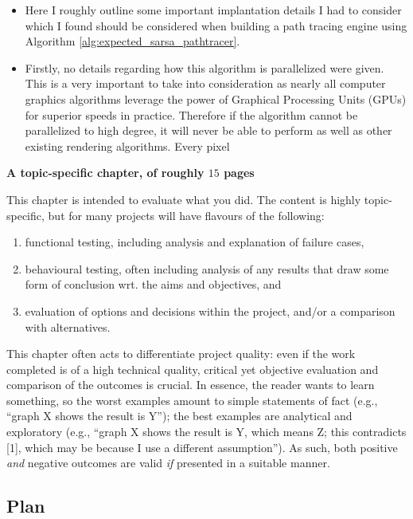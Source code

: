 \documentclass[ %
                    author={Callum Pearce},
                supervisor={Dr. Neill Campbell},
                    degree={MEng},
                     title={How effective are Temporal difference learning methods for reducing the number of zero contribution light paths, while still accurately approximating Global Illumination in Path tracing?},
                  subtitle={},
                      type={research},
                      year={2019} ]{dissertation}
\begin{document}
\begin{itemize}
\item Here I roughly outline some important implantation details I had to consider which I found should be considered when building a path tracing engine using Algorithm \ref{alg:expected_sarsa_pathtracer}.

\item Firstly, no details regarding how this algorithm is parallelized were given. This is a very important to take into consideration as nearly all computer graphics algorithms leverage the power of Graphical Processing Units (GPUs) for superior speeds in practice. Therefore if the algorithm cannot be parallelized to high degree, it will never be able to perform as well as other existing rendering algorithms.  Every pixel %
\end{itemize}

{\bf A topic-specific chapter, of roughly $15$ pages} 
\vspace{1cm} 

\noindent
This chapter is intended to evaluate what you did.  The content is highly 
topic-specific, but for many projects will have flavours of the following:

\begin{enumerate}
\item functional  testing, including analysis and explanation of failure 
      cases,
\item behavioural testing, often including analysis of any results that 
      draw some form of conclusion wrt. the aims and objectives,
      and
\item evaluation of options and decisions within the project, and/or a
      comparison with alternatives.
\end{enumerate}

\noindent
This chapter often acts to differentiate project quality: even if the work
completed is of a high technical quality, critical yet objective evaluation 
and comparison of the outcomes is crucial.  In essence, the reader wants to
learn something, so the worst examples amount to simple statements of fact 
(e.g., ``graph X shows the result is Y''); the best examples are analytical 
and exploratory (e.g., ``graph X shows the result is Y, which means Z; this 
contradicts [1], which may be because I use a different assumption'').  As 
such, both positive {\em and} negative outcomes are valid {\em if} presented 
in a suitable manner.

\subsection{Plan}
\end{document}
